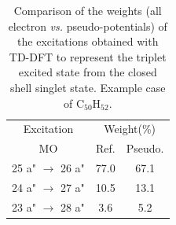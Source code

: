 \documentclass[12pt]{article}
\begin{document}
\newpage

\begin{table}
\begin{tabular}{c c c c}
\hline
\multicolumn{2}{c}{Excitation} & \multicolumn{2}{c}{Weight(\%)}\\
\multicolumn{2}{c}{MO} & Ref. & Pseudo.\\
\hline
\multicolumn{2}{c}{25 a" \(\rightarrow\) 26 a"} & 77.0 &   67.1  \\
\multicolumn{2}{c}{24 a" \(\rightarrow\) 27 a"} & 10.5 &   13.1  \\
\multicolumn{2}{c}{23 a" \(\rightarrow\) 28 a"} & 3.6  &    5.2  \\
\hline
\end{tabular}
\caption{\label{tab:coef}Comparison of the weights (all electron \emph{vs.} pseudo-potentials)
of the excitations obtained with TD-DFT
to represent the triplet excited state from the closed shell singlet state.
Example case of C$_{50}$H$_{52}$.}
\end{table}
\end{document}
